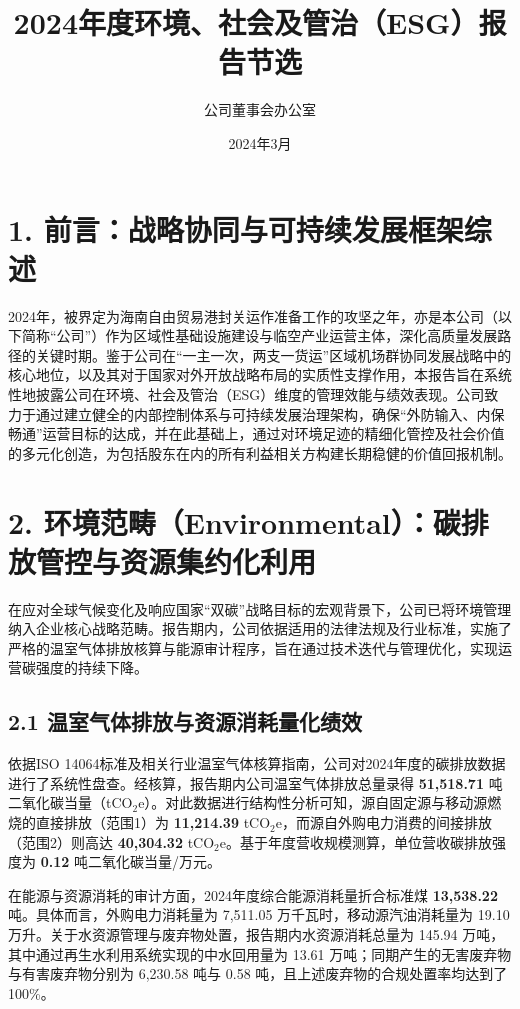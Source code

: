 \documentclass[a4paper,12pt]{article}
\title{\textbf{2024年度环境、社会及管治（ESG）报告节选}}
\author{公司董事会办公室}
\date{2024年3月}
\begin{document}
\maketitle


\section{1. 前言：战略协同与可持续发展框架综述}

2024年，被界定为海南自由贸易港封关运作准备工作的攻坚之年，亦是本公司（以下简称“公司”）作为区域性基础设施建设与临空产业运营主体，深化高质量发展路径的关键时期。鉴于公司在“一主一次，两支一货运”区域机场群协同发展战略中的核心地位，以及其对于国家对外开放战略布局的实质性支撑作用，本报告旨在系统性地披露公司在环境、社会及管治（ESG）维度的管理效能与绩效表现。公司致力于通过建立健全的内部控制体系与可持续发展治理架构，确保“外防输入、内保畅通”运营目标的达成，并在此基础上，通过对环境足迹的精细化管控及社会价值的多元化创造，为包括股东在内的所有利益相关方构建长期稳健的价值回报机制。

\section{2. 环境范畴（Environmental）：碳排放管控与资源集约化利用}

在应对全球气候变化及响应国家“双碳”战略目标的宏观背景下，公司已将环境管理纳入企业核心战略范畴。报告期内，公司依据适用的法律法规及行业标准，实施了严格的温室气体排放核算与能源审计程序，旨在通过技术迭代与管理优化，实现运营碳强度的持续下降。

\subsection{2.1 温室气体排放与资源消耗量化绩效}

依据ISO 14064标准及相关行业温室气体核算指南，公司对2024年度的碳排放数据进行了系统性盘查。经核算，报告期内公司温室气体排放总量录得 \textbf{51,518.71} 吨二氧化碳当量（tCO$_2$e）。对此数据进行结构性分析可知，源自固定源与移动源燃烧的直接排放（范围1）为 \textbf{11,214.39} tCO$_2$e，而源自外购电力消费的间接排放（范围2）则高达 \textbf{40,304.32} tCO$_2$e。基于年度营收规模测算，单位营收碳排放强度为 \textbf{0.12} 吨二氧化碳当量/万元。

在能源与资源消耗的审计方面，2024年度综合能源消耗量折合标准煤 \textbf{13,538.22} 吨。具体而言，外购电力消耗量为 7,511.05 万千瓦时，移动源汽油消耗量为 19.10 万升。关于水资源管理与废弃物处置，报告期内水资源消耗总量为 145.94 万吨，其中通过再生水利用系统实现的中水回用量为 13.61 万吨；同期产生的无害废弃物与有害废弃物分别为 6,230.58 吨与 0.58 吨，且上述废弃物的合规处置率均达到了 100\%。
\end{document}
